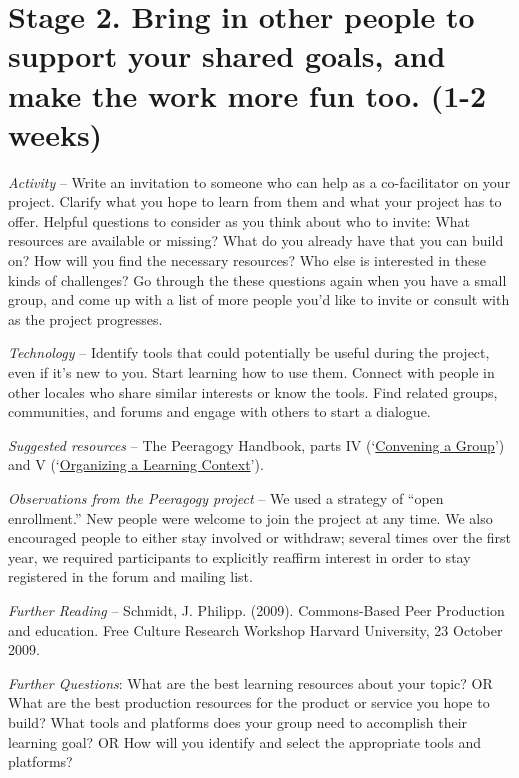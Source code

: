 \section*{Stage 2. Bring in other people to support your shared goals,
and make the work more fun too. (1-2
weeks)}\label{stage-2.-bring-in-other-people-to-support-your-shared-goals-and-make-the-work-more-fun-too.-1-2-weeks}

\emph{Activity} -- Write an invitation to someone who can help as a
co-facilitator on your project. Clarify what you hope to learn from them
and what your project has to offer. Helpful questions to consider as you
think about who to invite: What resources are available or missing? What
do you already have that you can build on? How will you find the
necessary resources? Who else is interested in these kinds of
challenges? Go through the these questions again when you have a small
group, and come up with a list of more people you'd like to invite or
consult with as the project progresses.

\emph{Technology} -- Identify tools that could potentially be useful
during the project, even if it's new to you. Start learning how to use
them. Connect with people in other locales who share similar interests
or know the tools. Find related groups, communities, and forums and
engage with others to start a dialogue.

\emph{Suggested resources} -- The Peeragogy Handbook, parts IV
(`\href{http://peeragogy.org/convening-a-group/}{Convening a Group}')
and V
(`\href{http://peeragogy.org/organizing-a-learning-context/}{Organizing
a Learning Context}').

\emph{Observations from the Peeragogy project} -- We used a strategy of
``open enrollment.'' New people were welcome to join the project at any
time. We also encouraged people to either stay involved or withdraw;
several times over the first year, we required participants to
explicitly reaffirm interest in order to stay registered in the forum
and mailing list.

\emph{Further Reading} -- Schmidt, J. Philipp. (2009). Commons-Based
Peer Production and education. Free Culture Research Workshop Harvard
University, 23 October 2009.

\emph{Further Questions}: {What are the best learning
resources about your topic?} OR {What are the best
production resources for the product or service you hope to build?}
{What tools and platforms does your group need to accomplish their learning goal?} OR
{How will you identify and select the appropriate tools and platforms?}

